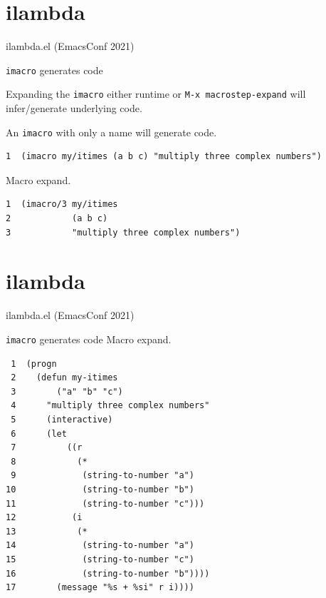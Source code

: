 \documentclass[presentation]{beamer}
\begin{document}
\section{ilambda}
\label{sec:org5d5c257}
\begin{frame}[label={sec:org0faf966},fragile]{ilambda.el (EmacsConf 2021)}
 \begin{block}{\texttt{imacro} generates code}
{\tiny
Expanding the \texttt{imacro} either runtime or 
\texttt{M-x macrostep-expand}
will infer/generate underlying code.

An \texttt{imacro} with only a name will generate code.
}

{\tiny
\begin{verbatim}
1  (imacro my/itimes (a b c) "multiply three complex numbers")
\end{verbatim}
}

{\tiny
Macro expand.
}

{\tiny
\begin{verbatim}
1  (imacro/3 my/itimes
2            (a b c)
3            "multiply three complex numbers")
\end{verbatim}
}
\end{block}
\end{frame}

\section{ilambda}
\label{sec:org772e907}
\begin{frame}[label={sec:org9c974da},fragile]{ilambda.el (EmacsConf 2021)}
 \begin{block}{\texttt{imacro} generates code}
{\tiny
Macro expand.
}

{\tiny
\begin{verbatim}
 1  (progn
 2    (defun my-itimes
 3        ("a" "b" "c")
 4      "multiply three complex numbers"
 5      (interactive)
 6      (let
 7          ((r
 8            (*
 9             (string-to-number "a")
10             (string-to-number "b")
11             (string-to-number "c")))
12           (i
13            (*
14             (string-to-number "a")
15             (string-to-number "c")
16             (string-to-number "b"))))
17        (message "%s + %si" r i))))
\end{verbatim}
}
\end{block}
\end{frame}
\end{document}
